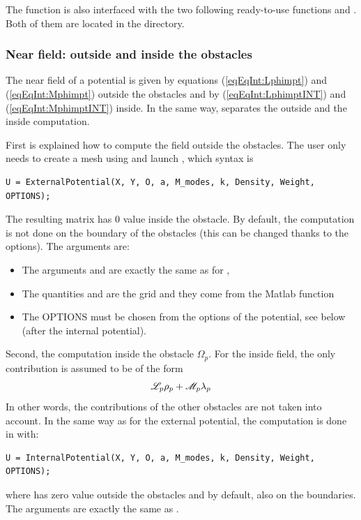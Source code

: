 \begin{remark}
The \RCS function is also interfaced with the two following ready-to-use functions \RCSSingleLayer and \RCSDoubleLayer. Both of them are located in the  directory.
\end{remark}


\subsubsection{Near field: outside and inside the obstacles}
\label{secFun:ExternalPotential}
\label{secFun:InternalPotential}
\label{secFun:ExternalSingleLayerPotential}
\label{secFun:ExternalDoubleLayerPotential}
\label{secFun:InternalSingleLayerPotential}
\label{secFun:InternalDoubleLayerPotential}
\label{secFun:GetPotentialOptions}
\label{secFun:BlockPotential}

The near field of a potential is given by equations (\ref{eqEqInt:Lphimpt}) and (\ref{eqEqInt:Mphimpt}) outside the obstacles and by (\ref{eqEqInt:LphimptINT}) and (\ref{eqEqInt:MphimptINT}) inside. In the same way, \mudiff separates the outside and the inside computation. 

First is explained how to compute the field outside the obstacles. The user only needs to create a mesh using \eg {} and launch \ExternalPotential, which syntax is
\begin{lstlisting}
U = ExternalPotential(X, Y, O, a, M_modes, k, Density, Weight, OPTIONS);
\end{lstlisting}
The resulting matrix  has $0$ value inside the obstacle. By default, the computation is not done on the boundary of the obstacles (this can be changed thanks to the options). The arguments are:
\begin{itemize}
\item The arguments  and  are exactly the same as for \FarField,
\item The quantities  and  are the grid and they come from the Matlab  function
\item The OPTIONS must be chosen from the options of the potential, see below (after the internal potential).
\end{itemize}

Second, the computation inside the obstacle $\Omega_p$. For the inside field, the only contribution is assumed to be of the form 
$$
{\mathscr L}_p\rho_p + {\mathscr M}_p\lambda_p
$$
In other words, the contributions of the other obstacles are not taken into account. In the same way as for the external potential, the computation is done in \mudiff with:
\begin{lstlisting}
U = InternalPotential(X, Y, O, a, M_modes, k, Density, Weight, OPTIONS);
\end{lstlisting}
where  has zero value outside the obstacles and by default, also on the boundaries. The arguments are exactly the same as \ExternalPotential.


